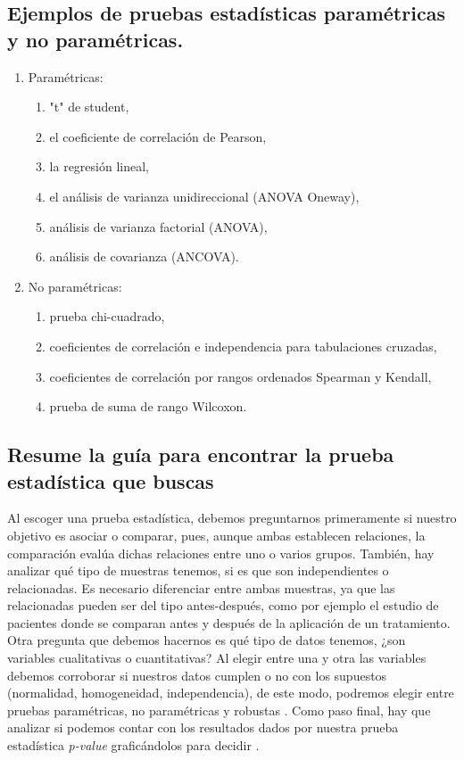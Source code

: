 \documentclass[]{article}
\begin{document}
\subsection{Ejemplos de pruebas estadísticas	paramétricas y no paramétricas.}
\begin{enumerate}    
\item Paramétricas:

  \begin{enumerate}
    \item "t" de student,
    \item el coeficiente de correlación de Pearson,
    \item la regresión lineal,
    \item el análisis de varianza unidireccional (ANOVA Oneway), 
    \item análisis de varianza factorial (ANOVA), 
    \item análisis de covarianza (ANCOVA).

  \end{enumerate}
  
\item No paramétricas:
  \begin{enumerate}
    \item prueba chi-cuadrado,
    \item coeficientes de correlación e independencia para tabulaciones cruzadas,
    \item coeficientes de correlación por rangos ordenados Spearman y Kendall,
    \item prueba de suma de rango Wilcoxon.
  \end{enumerate}
\end{enumerate}


\subsection{Resume la guía para encontrar la prueba estadística que buscas}

Al escoger una prueba estadística, debemos preguntarnos primeramente si nuestro objetivo es asociar o comparar, pues, aunque ambas establecen relaciones, la comparación evalúa dichas relaciones entre uno o varios grupos. También, hay analizar qué tipo de muestras tenemos, si es que son independientes o relacionadas. Es necesario diferenciar entre ambas muestras, ya que las relacionadas pueden ser del tipo antes-después, como por ejemplo el estudio de pacientes donde se comparan antes y después de la aplicación de un tratamiento.
Otra pregunta que debemos hacernos es qué tipo de datos tenemos, ¿son variables cualitativas
o cuantitativas? Al elegir entre una y otra las variables debemos corroborar si nuestros datos cumplen o no con los supuestos (normalidad, homogeneidad, independencia), de este modo, podremos elegir entre pruebas paramétricas, no paramétricas y robustas \cite{Articulo_3}.
Como paso final, hay que analizar si podemos contar con los resultados dados por nuestra prueba estadística \textit{p-value} graficándolos para decidir .
\end{document}
